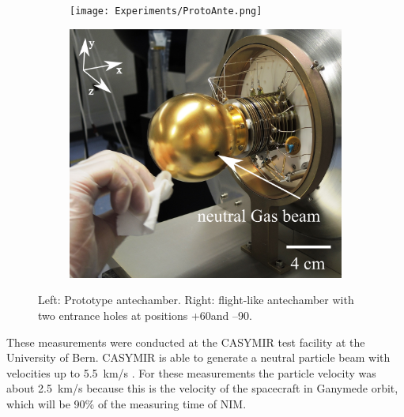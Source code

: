 	\begin{figure}[h!]
		\begin{subfigure}{.5\textwidth}
			\centering
			\texttt{[image: Experiments/ProtoAnte.png]}
		\end{subfigure}
		\begin{subfigure}{.5\textwidth}
			\centering
			\includegraphics[width=.8\textwidth]{Experiments/FlightAnte.png}
		\end{subfigure}
		\caption{Left: Prototype antechamber. Right: flight-like antechamber with two entrance holes at positions +60\degree and --90\degree.}
		\label{fig:expAntchamPic}
	\end{figure}
	These measurements were conducted at the CASYMIR test facility at the University of Bern. CASYMIR is able to generate a neutral particle beam with velocities up to 5.5~km/s \cite{CASYMIR_Graf2004}. For these measurements the particle velocity was about 2.5~km/s because this is the velocity of the spacecraft in Ganymede orbit, which will be 90\% of the measuring time of NIM.\\

